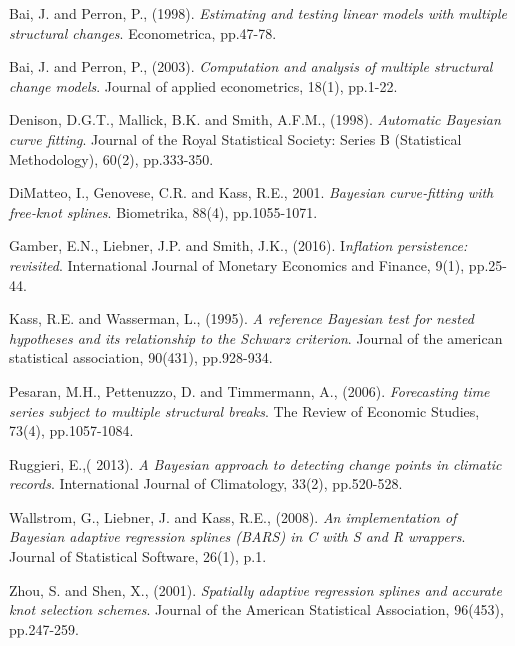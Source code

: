 \documentclass[submit]{smj}
\begin{document}
\begin{thebibliography}{99}
Bai, J. and Perron, P., (1998).
\textit{Estimating and testing linear models with multiple structural changes}.
Econometrica, pp.47-78.

Bai, J. and Perron, P., (2003).
\textit{ Computation and analysis of multiple structural change models}.
Journal of applied econometrics, 18(1), pp.1-22.

Denison, D.G.T., Mallick, B.K. and Smith, A.F.M., (1998). 
\textit{Automatic Bayesian curve fitting}. 
Journal of the Royal Statistical Society: Series B (Statistical Methodology), 60(2), pp.333-350.

DiMatteo, I., Genovese, C.R. and Kass, R.E., 2001. 
\textit{Bayesian curve‐fitting with free‐knot splines}. 
Biometrika, 88(4), pp.1055-1071.

Gamber, E.N., Liebner, J.P. and Smith, J.K., (2016). 
I\textit{nflation persistence: revisited}. 
International Journal of Monetary Economics and Finance, 9(1), pp.25-44.

Kass, R.E. and Wasserman, L., (1995). 
\textit{A reference Bayesian test for nested hypotheses and its relationship to the Schwarz criterion}. 
Journal of the american statistical association, 90(431), pp.928-934.

Pesaran, M.H., Pettenuzzo, D. and Timmermann, A., (2006). 
\textit{Forecasting time series subject to multiple structural breaks}. 
The Review of Economic Studies, 73(4), pp.1057-1084.

Ruggieri, E.,( 2013). 
\textit{A Bayesian approach to detecting change points in climatic records}.
International Journal of Climatology, 33(2), pp.520-528.

Wallstrom, G., Liebner, J. and Kass, R.E., (2008). 
\textit{An implementation of Bayesian adaptive regression splines (BARS) in C with S and R wrappers}. 
Journal of Statistical Software, 26(1), p.1.

Zhou, S. and Shen, X., (2001). 
\textit{Spatially adaptive regression splines and accurate knot selection schemes}.
Journal of the American Statistical Association, 96(453), pp.247-259.

\end{thebibliography}
\end{document}
